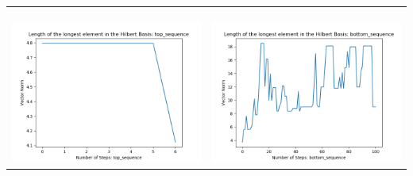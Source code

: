 \documentclass[10pt]{article}
\begin{document}
\begin{tabular}{c|c}
\begin{minipage}{.45\textwidth}
\end{minipage} \\ \\
\hline \\\begin{minipage}{.45\textwidth}
\includegraphics[width=\textwidth]{"DATA/5d/5 generators 2 bound B/top_sequence LENGTH"}
\end{minipage} &
\begin{minipage}{.45\textwidth}
\includegraphics[width=\textwidth]{"DATA/5d/5 generators 2 bound B bottomup/bottom_sequence LENGTH"}
\end{minipage}
\end{tabular}
\end{document}
